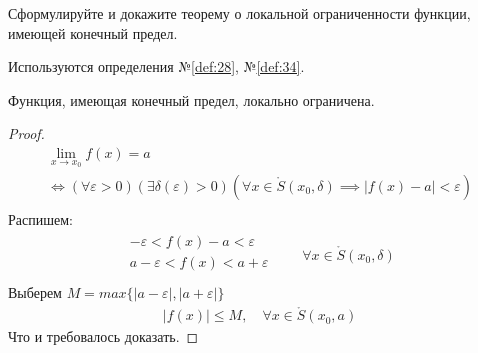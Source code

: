 \begin{question}
    Сформулируйте и докажите теорему о локальной ограниченности функции, имеющей конечный предел.
\end{question}
\begin{used}
    Используются определения №\ref{def:28}, №\ref{def:34}.
\end{used}
\begin{theorem}
    Функция, имеющая конечный предел, локально ограничена.
\end{theorem}
\begin{proof}
    \begin{gather*}
        \lim_{x \to x_0} f(x) = a \\
        \iff (\forall \varepsilon > 0)(\exists \delta(\varepsilon) > 0) (\forall x \in \mathring{S}(x_0, \delta) \implies |f(x) - a| < \varepsilon) \\
    \end{gather*}
    Распишем:
    \begin{gather*}
        \begin{matrix}
            - \varepsilon < f(x) - a < \varepsilon \\
            a - \varepsilon < f(x) < a + \varepsilon \\
        \end{matrix}
        \qquad
        \forall  x \in \mathring{S}(x_0, \delta)
    \end{gather*}
    Выберем $M = max\{|a - \varepsilon|, |a + \varepsilon|\}$ 
    \begin{gather*}
        |f(x)| \le  M, \quad \forall  x \in  \mathring{S}(x_0, a)
    \end{gather*}
    Что и требовалось доказать.
\end{proof}
\pagebreak




